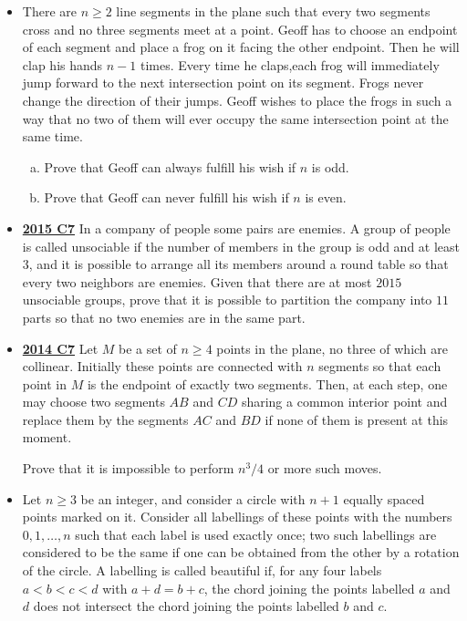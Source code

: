 \documentclass[11pt]{scrartcl}
\begin{document}
\begin{itemize}[leftmargin=*]
    \item {} There are $n\geqslant 2$ line segments in the plane such that every two segments cross and no three segments meet at a point. Geoff has to choose an endpoint of each segment and place a frog on it facing the other endpoint. Then he will clap his hands $n-1$ times. Every time he claps,each frog will immediately jump forward to the next intersection point on its segment. Frogs never change the direction of their jumps. Geoff wishes to place the frogs in such a way that no two of them will ever occupy the same intersection point at the same time.
    \begin{enumerate}[(a)]
        \item  Prove that Geoff can always fulfill his wish if $n$ is odd.
        \item Prove that Geoff can never fulfill his wish if $n$ is even.
    \end{enumerate}
    \item \href{https://artofproblemsolving.com/community/c6h1268906p6622769}{\textbf{2015 C7}} In a company of people some pairs are enemies. A group of people is called unsociable if the number of members in the group is odd and at least $3$, and it is possible to arrange all its members around a round table so that every two neighbors are enemies. Given that there are at most $2015$ unsociable groups, prove that it is possible to partition the company into $11$ parts so that no two enemies are in the same part.
 
    \item \href{https://artofproblemsolving.com/community/c6h1113187p5083554}{\textbf{2014 C7}} Let $M$ be a set of $n \geqslant 4$ points in the plane, no three of which are collinear. Initially these points are connected with $n$ segments so that each point in $M$ is the endpoint of exactly two segments. Then, at each step, one may choose two segments $AB$ and $CD$ sharing a common interior point and replace them by the segments $AC$ and $BD$ if none of them is present at this moment. 
    
    Prove that it is impossible to perform $n^3 /4$ or more such moves.
    \item {} Let $n \geqslant 3$ be an integer, and consider a circle with $n + 1$ equally spaced points marked on it. Consider all labellings of these points with the numbers $0, 1, \dots , n$ such that each label is used exactly once; two such labellings are considered to be the same if one can be obtained from the other by a rotation of the circle. A labelling is called beautiful if, for any four labels $a < b < c < d$ with $a + d = b + c$, the chord joining the points labelled $a$ and $d$ does not intersect the chord joining the points labelled $b$ and $c$.


\end{itemize}
\end{document}
